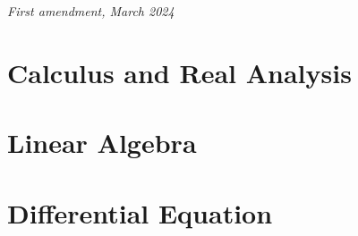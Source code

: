 \documentclass[
	12pt, %
	fleqn, %
	a4paper, %
]{LegrandOrangeBook}
\newcommand{\0}{\mathbf{0}} %
\theoremstyle{lemmastyle}
\theoremstyle{solutionStyle}
\theoremstyle{axiom_style}
\begin{document}
\noindent \textit{First amendment, March 2024} %


\pagestyle{empty} %

\tableofcontents %

\listoffigures %

\listoftables %

\pagestyle{fancy} %

\cleardoublepage %


\part{Calculus and Real Analysis}


\part{Linear Algebra}


\part{Differential Equation}



\end{document}
